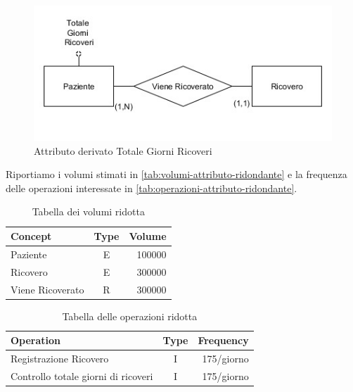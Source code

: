 \documentclass{article}
\begin{document}
\begin{figure}[H] %
	\centering
	\includegraphics[width=\linewidth]{totalegiorni}
	\caption{Attributo derivato Totale Giorni Ricoveri}
	\label{fig:attributo-ridondante}
\end{figure}

Riportiamo i volumi stimati in \autoref{tab:volumi-attributo-ridondante} e la frequenza delle operazioni interessate in \autoref{tab:operazioni-attributo-ridondante}.

\begin{table}[H]
	\centering
	\begin{tabular}{|l|c|r|}
		\hline
		\textbf{Concept} & \textbf{Type} & \textbf{Volume} \\ \hline
		Paziente         & E             & 100000          \\ \hline
		Ricovero         & E             & 300000          \\ \hline
		Viene Ricoverato & R             & 300000          \\ \hline
	\end{tabular}
	\caption{Tabella dei volumi ridotta}
	\label{tab:volumi-attributo-ridondante}
\end{table}

\begin{table}[H]
	\centering
	\begin{tabular}{|l|c|r|}
		\hline
		\textbf{Operation}                  & \textbf{Type} & \textbf{Frequency} \\ \hline
		Registrazione Ricovero              & I             & 175/giorno         \\ \hline
		Controllo totale giorni di ricoveri & I             & 175/giorno         \\ \hline %
	\end{tabular}
	\caption{Tabella delle operazioni ridotta}
	\label{tab:operazioni-attributo-ridondante}
\end{table}
\end{document}
